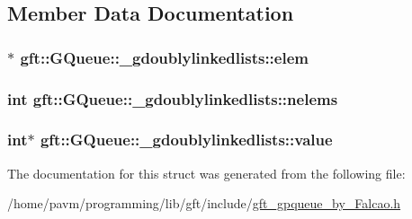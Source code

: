\subsection{Member Data Documentation}
\hypertarget{structgft_1_1GQueue_1_1__gdoublylinkedlists_a381d0f6225cc5644302a285b7535e9d3}{
\subsubsection[{elem}]{$\ast$ gft\-::\-G\-Queue\-::\-\_\-gdoublylinkedlists\-::elem}}\label{structgft_1_1GQueue_1_1__gdoublylinkedlists_a381d0f6225cc5644302a285b7535e9d3}
\hypertarget{structgft_1_1GQueue_1_1__gdoublylinkedlists_ab103b5cd4de4ad5b7053f05102c62595}{
\subsubsection[{nelems}]{\setlength{\rightskip}{0pt plus 5cm}int gft\-::\-G\-Queue\-::\-\_\-gdoublylinkedlists\-::nelems}}\label{structgft_1_1GQueue_1_1__gdoublylinkedlists_ab103b5cd4de4ad5b7053f05102c62595}
\hypertarget{structgft_1_1GQueue_1_1__gdoublylinkedlists_a0c1b6b1d931f88f969d1d6f1ee61828b}{
\subsubsection[{value}]{\setlength{\rightskip}{0pt plus 5cm}int$\ast$ gft\-::\-G\-Queue\-::\-\_\-gdoublylinkedlists\-::value}}\label{structgft_1_1GQueue_1_1__gdoublylinkedlists_a0c1b6b1d931f88f969d1d6f1ee61828b}


The documentation for this struct was generated from the following file\-:\begin{DoxyCompactItemize}
\item 
/home/pavm/programming/lib/gft/include/\hyperlink{gft__gpqueue__by__Falcao_8h}{gft\-\_\-gpqueue\-\_\-by\-\_\-\-Falcao.\-h}\end{DoxyCompactItemize}
